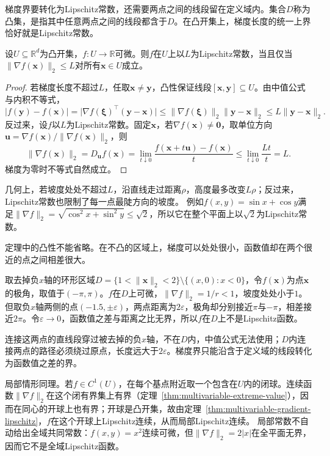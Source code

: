 梯度界要转化为Lipschitz常数，还需要两点之间的线段留在定义域内。集合$D$称为凸集，是指其中任意两点之间的线段都含于$D$。在凸开集上，梯度长度的统一上界恰好就是Lipschitz常数。
\begin{theorem}[梯度有界与Lipschitz条件]
\label{thm:multivariable-gradient-lipschitz}
设$U\subseteq\mathbb R^d$为凸开集，$f:U\to\mathbb R$可微。则$f$在$U$上以$L$为Lipschitz常数，当且仅当$\lVert\nabla f(\bm x)\rVert_2\leq L$对所有$\bm x\in U$成立。
\end{theorem}
\begin{proof}
若梯度长度不超过$L$，任取$\bm x\neq\bm y$，凸性保证线段$[\bm x,\bm y]\subseteq U$。由中值公式与内积不等式，
\[
 |f(\bm y)-f(\bm x)|=\bigl|\nabla f(\bm\xi)^\top(\bm y-\bm x)\bigr|\leq\lVert\nabla f(\bm\xi)\rVert_2\lVert\bm y-\bm x\rVert_2\leq L\lVert\bm y-\bm x\rVert_2.
\]
反过来，设$f$以$L$为Lipschitz常数。固定$\bm x$，若$\nabla f(\bm x)\neq\bm0$，取单位方向$\bm u=\nabla f(\bm x)/\lVert\nabla f(\bm x)\rVert_2$，则
\[
 \lVert\nabla f(\bm x)\rVert_2=D_{\bm u}f(\bm x)=\lim_{t\downarrow0}\frac{f(\bm x+t\bm u)-f(\bm x)}t\leq\lim_{t\downarrow0}\frac{Lt}t=L.
\]
梯度为零时不等式自然成立。
\end{proof}
几何上，若坡度处处不超过$L$，沿直线走过距离$\rho$，高度最多改变$L\rho$；反过来，Lipschitz常数也限制了每一点最陡方向的坡度。
例如$f(x,y)=\sin x+\cos y$满足$\lVert\nabla f\rVert_2=\sqrt{\cos^2x+\sin^2y}\leq\sqrt2$，所以它在整个平面上以$\sqrt2$为Lipschitz常数。

定理中的凸性不能省略。在不凸的区域上，梯度可以处处很小，函数值却在两个很近的点之间相差很大。
\begin{example}[非凸区域上梯度有界而不Lipschitz]
\label{ex:multivariable-nonconvex-lipschitz-failure}
取去掉负$x$轴的环形区域$D=\{1<\lVert\bm x\rVert_2<2\}\setminus\{(x,0):x<0\}$，令$f(\bm x)$为点$\bm x$的极角，取值于$(-\pi,\pi)$。$f$在$D$上可微，$\lVert\nabla f\rVert_2=1/r<1$，坡度处处小于$1$。
但取负$x$轴两侧的点$(-1.5,\pm\varepsilon)$，两点距离为$2\varepsilon$，极角却分别接近$\pi$与$-\pi$，相差接近$2\pi$。令$\varepsilon\to0$，函数值之差与距离之比无界，所以$f$在$D$上不是Lipschitz函数。
\end{example}

连接这两点的直线段穿过被去掉的负$x$轴，不在$D$内，中值公式无法使用；$D$内连接两点的路径必须绕过原点，长度远大于$2\varepsilon$。梯度界只能沿含于定义域的线段转化为函数值之差的界。

局部情形同理。若$f\in C^1(U)$，在每个基点附近取一个包含在$U$内的闭球。连续函数$\lVert\nabla f\rVert_2$在这个闭有界集上有界（定理~\ref{thm:multivariable-extreme-value}），因而在同心的开球上也有界；开球是凸开集，故由定理~\ref{thm:multivariable-gradient-lipschitz}，$f$在这个开球上Lipschitz连续，从而局部Lipschitz连续。
局部常数不自动给出全域共同常数：$f(x,y)=x^2$连续可微，但$\lVert\nabla f\rVert_2=2|x|$在全平面无界，因而它不是全域Lipschitz函数。

